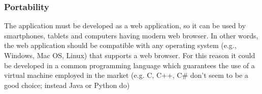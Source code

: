 \subsubsection{Portability}
The application must be developed as a web application, so it can be used by smartphones, tablets and computers having modern web browser. In other words, the web application should be compatible with any operating system (e.g., Windows, Mac OS, Linux) that supports a web browser. For this reason it could be developed in a common programming language which guarantees the use of a virtual machine employed in the market (e.g. C, C++, C\# don't seem to be a good choice; instead Java or Python do) 

